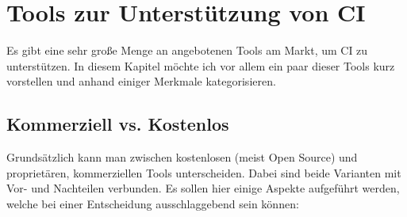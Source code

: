\pagebreak

\chapter{Tools zur Unterstützung von CI}
Es gibt eine sehr große Menge an angebotenen Tools am Markt, um CI zu unterstützen. In diesem Kapitel möchte ich vor allem ein paar dieser Tools kurz vorstellen und anhand einiger Merkmale kategorisieren.
\section{Kommerziell vs. Kostenlos}
Grundsätzlich kann man zwischen kostenlosen (meist Open Source) und proprietären, kommerziellen Tools unterscheiden. Dabei sind beide Varianten mit Vor- und Nachteilen verbunden. Es sollen hier einige Aspekte aufgeführt werden, welche bei einer Entscheidung ausschlaggebend sein können:
